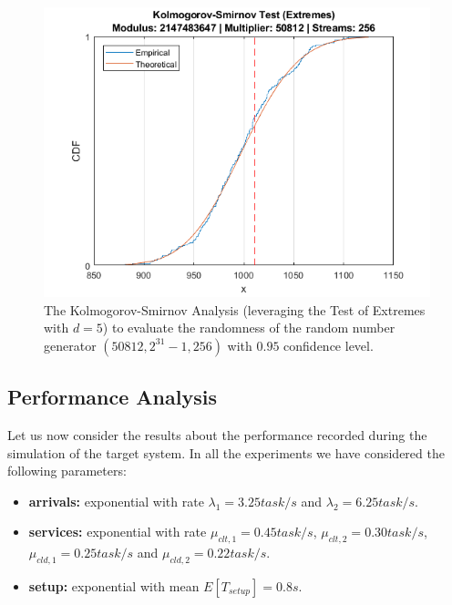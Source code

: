 \begin{figure}
	\includegraphics[width=\columnwidth]{fig/evaluation-randomness-kolmogorov-smirnov-50812}
	\caption{The Kolmogorov-Smirnov Analysis (leveraging the Test of Extremes with $d=5$) to evaluate the randomness of the random number generator $(50812,2^{31}-1, 256)$ with $0.95$ confidence level.}
	\label{fig:evaluation-randomness-kolmogorov-smirnov-50812}
\end{figure}


\subsection{Performance Analysis}
Let us now consider the results about the performance recorded during the simulation of the target system.
In all the experiments we have considered the following parameters:

\begin{itemize}
	\item \textbf{arrivals:} exponential with rate $\lambda_{1}=3.25 task/s$ and $\lambda_{2}=6.25 task/s$.
	\item \textbf{services:} exponential with rate $\mu_{clt,1} = 0.45 task/s$, $\mu_{clt,2} = 0.30 task/s$, $\mu_{cld,1} = 0.25 task/s$ and $\mu_{cld,2} = 0.22 task/s$.
	\item \textbf{setup:} exponential with mean $E[T_{setup}]=0.8s$.
\end{itemize}

